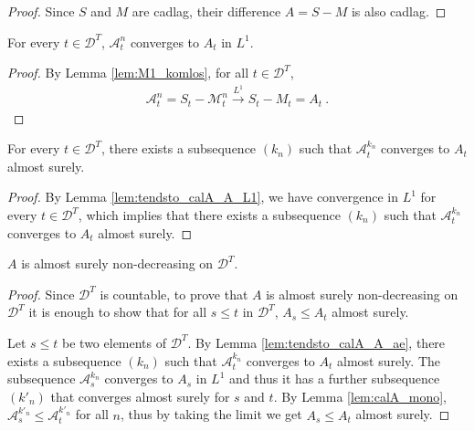 \begin{proof}
Since $S$ and $M$ are cadlag, their difference $A = S - M$ is also cadlag.
\end{proof}


\begin{lemma}\label{lem:tendsto_calA_A_L1}
For every $t\in \mathcal{D}^T$, $\mathcal{A}^n_t$ converges to $A_t$ in $L^1$.
\end{lemma}

\begin{proof}
By Lemma \ref{lem:M1_komlos}, for all $t\in\mathcal{D}^T$,
\begin{align*}
  \mathcal{A}^n_t
  = S_t - \mathcal{M}^n_t
  \stackrel{L^1}{\rightarrow} S_t-M_t
  = A_t
  \: .
\end{align*}
\end{proof}


\begin{lemma}\label{lem:tendsto_calA_A_ae}
For every $t\in \mathcal{D}^T$, there exists a subsequence $(k_n)$ such that $\mathcal{A}^{k_n}_t$ converges to $A_t$ almost surely.
\end{lemma}

\begin{proof}
By Lemma \ref{lem:tendsto_calA_A_L1}, we have convergence in $L^1$ for every $t\in \mathcal{D}^T$, which implies that there exists a subsequence $(k_n)$ such that $\mathcal{A}^{k_n}_t$ converges to $A_t$ almost surely.
\end{proof}

\begin{lemma}\label{lem:A_mono_dyadics}
$A$ is almost surely non-decreasing on $\mathcal{D}^T$.
\end{lemma}

\begin{proof}
Since $\mathcal{D}^T$ is countable, to prove that $A$ is almost surely non-decreasing on $\mathcal{D}^T$ it is enough to show that for all $s \le t$ in $\mathcal{D}^T$, $A_s \le A_t$ almost surely.

Let $s \le t$ be two elements of $\mathcal{D}^T$.
By Lemma \ref{lem:tendsto_calA_A_ae}, there exists a subsequence $(k_n)$ such that $\mathcal{A}^{k_n}_t$ converges to $A_t$ almost surely.
The subsequence $\mathcal{A}_s^{k_n}$ converges to $A_s$ in $L^1$ and thus it has a further subsequence $(k'_n)$ that converges almost surely for $s$ and $t$.
By Lemma \ref{lem:calA_mono}, $\mathcal{A}^{k'_n}_s \le \mathcal{A}^{k'_n}_t$ for all $n$, thus by taking the limit we get $A_s \le A_t$ almost surely.
\end{proof}



